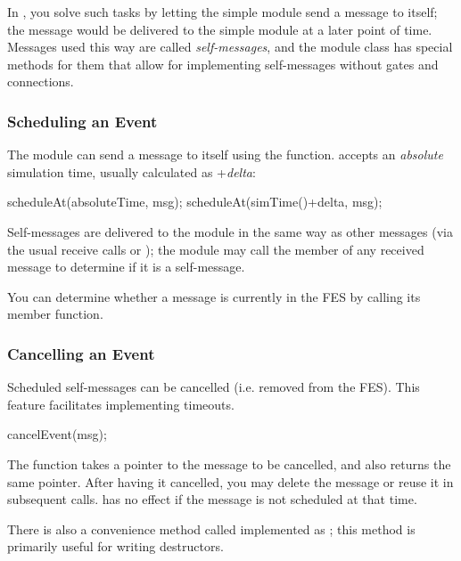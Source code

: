 In {\opp}, you solve such tasks by letting the simple module send a message
to itself; the message would be delivered to the simple module at a later
point of time. Messages used this way are called
\textit{self-messages}, and the module class has
special methods for them that allow for implementing self-messages without
gates and connections.

\subsubsection{Scheduling an Event}

The module can send a message to itself using the  function.
 accepts an \textit{absolute} simulation time,
usually calculated as +\textit{delta}:

\begin{cpp}
scheduleAt(absoluteTime, msg);
scheduleAt(simTime()+delta, msg);
\end{cpp}

Self-messages are delivered to the module in the same way as other
messages (via the usual receive calls or );
the module may call the  member of any received
message to determine if it is a self-message.

You can determine whether a message is currently in the FES
by calling its  member function.

\subsubsection{Cancelling an Event}

Scheduled self-messages can be cancelled
 (i.e. removed from the FES).
This feature facilitates implementing timeouts.

\begin{cpp}
cancelEvent(msg);
\end{cpp}

The  function takes a pointer to the message to
be cancelled, and also returns the same pointer. After having it
cancelled, you may delete the message or reuse it in subsequent
 calls.  has no effect if
the message is not scheduled at that time.

There is also a convenience method called 
implemented as ;
this method is primarily useful for writing destructors.

